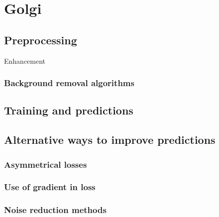 \section{Golgi}
    \subsection{Preprocessing}
        Enhancement
        
        \subsubsection{Background removal algorithms}
            
    \subsection{Training and predictions}
        

    \subsection{Alternative ways to improve predictions}
        \subsubsection{Asymmetrical losses}
            
        \subsubsection{Use of gradient in loss}
        \subsubsection{Noise reduction methods}
